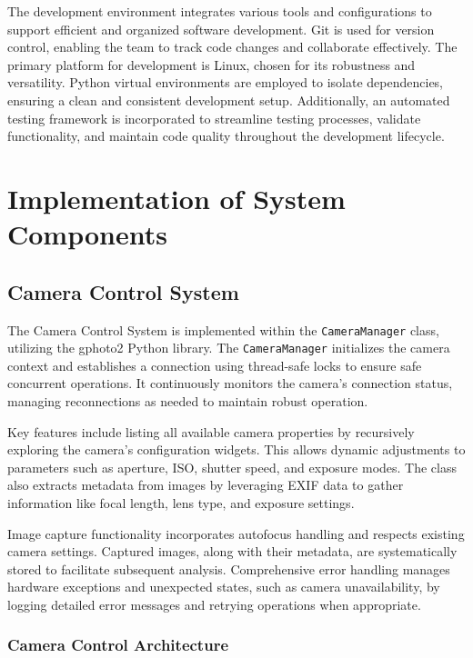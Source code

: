 The development environment integrates various tools and configurations to support efficient and organized software development. Git is used for version control, enabling the team to track code changes and collaborate effectively. The primary platform for development is Linux, chosen for its robustness and versatility. Python virtual environments are employed to isolate dependencies, ensuring a clean and consistent development setup. Additionally, an automated testing framework is incorporated to streamline testing processes, validate functionality, and maintain code quality throughout the development lifecycle.

\section{Implementation of System Components}

\subsection{Camera Control System}

The Camera Control System is implemented within the \texttt{CameraManager} class, utilizing the gphoto2 Python library. The \texttt{CameraManager} initializes the camera context and establishes a connection using thread-safe locks to ensure safe concurrent operations. It continuously monitors the camera's connection status, managing reconnections as needed to maintain robust operation.

Key features include listing all available camera properties by recursively exploring the camera's configuration widgets. This allows dynamic adjustments to parameters such as aperture, ISO, shutter speed, and exposure modes. The class also extracts metadata from images by leveraging EXIF data to gather information like focal length, lens type, and exposure settings.

Image capture functionality incorporates autofocus handling and respects existing camera settings. Captured images, along with their metadata, are systematically stored to facilitate subsequent analysis. Comprehensive error handling manages hardware exceptions and unexpected states, such as camera unavailability, by logging detailed error messages and retrying operations when appropriate.

\subsubsection{Camera Control Architecture}

